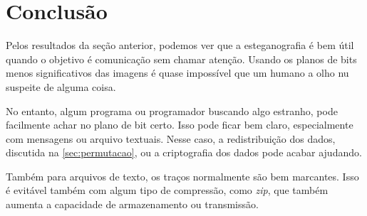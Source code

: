 \section{Conclusão}

Pelos resultados da seção anterior, podemos ver que a esteganografia é bem útil quando o objetivo é comunicação sem chamar atenção. Usando os planos de bits menos significativos das imagens é quase impossível que um humano a olho nu suspeite de alguma coisa.

No entanto, algum programa ou programador buscando algo estranho, pode facilmente achar no plano de bit certo. Isso pode ficar bem claro, especialmente com mensagens ou arquivo textuais. Nesse caso, a redistribuição dos dados, discutida na \cref{sec:permutacao}, ou a criptografia dos dados pode acabar ajudando.

Também para arquivos de texto, os traços normalmente são bem marcantes. Isso é evitável também com algum tipo de compressão, como \textit{zip}, que também aumenta a capacidade de armazenamento ou transmissão.
